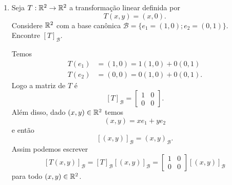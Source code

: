 \begin{exemplos}
	\begin{enumerate}
		\item Seja $T : \mathbb{R}^2 \to \mathbb{R}^2$ a transformação linear definida por
		\[
			T(x,y) = (x,0).
		\]
		Considere $\mathbb{R}^2$ com a base canônica $\mathcal{B} = \{e_1=(1,0);e_2=(0,1)\}$. Encontre $[T]_\mathcal{B}$.
		\begin{solucao}
			Temos
			\begin{align*}
				T(e_1) &= (1,0) = 1(1,0) + 0(0,1)\\
				T(e_2) &= (0,0) = 0(1,0) + 0(0,1).
			\end{align*}
			Logo a matriz de $T$ é
			\[
				[T]_\mathcal{B} = \begin{bmatrix}
					1 & 0\\
					0 & 0
				\end{bmatrix}.
			\]
			Além disso, dado $(x,y) \in \mathbb{R}^2$ temos
			\[
				(x,y) = xe_1 + ye_2
			\]
			e então
			\[
				[(x,y)]_\mathcal{B} = (x,y)_\mathcal{B}.
			\]
			Assim podemos escrever
			\[
				[T(x,y)]_\mathcal{B} = [T]_\mathcal{B}[(x,y)]_\mathcal{B} = \begin{bmatrix}
					1 & 0\\
					0 & 0
				\end{bmatrix}[(x,y)]_\mathcal{B}
			\]
			para todo $(x,y) \in \mathbb{R}^2$.
		\end{solucao}


\end{enumerate}
\end{exemplos}
